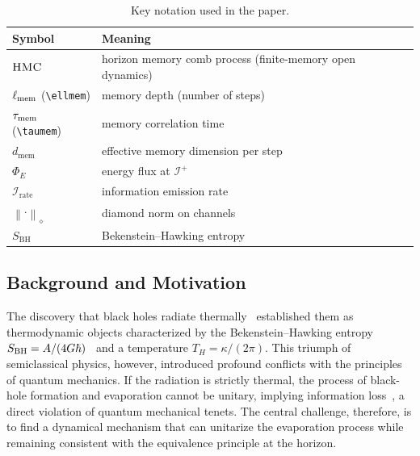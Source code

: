\documentclass[a4paper,11pt]{article}
\newcommand{\Irate}{\mathcal{I}_{\mathrm{rate}}}
\newcommand{\Eflux}{\Phi_E}
\newcommand{\Ddiamond}[1]{\left\|#1\right\|_\diamond}
\newcommand{\HMC}{\textsc{HMC}\xspace}
\newcommand{\dmem}{\ensuremath{d_{\mathrm{mem}}}}
\newcommand{\SBH}{\ensuremath{S_{\mathrm{BH}}}}
\theoremstyle{plain}
\theoremstyle{definition}
\theoremstyle{remark}
\begin{document}
\begin{table}[t]
  \centering
  \caption{Key notation used in the paper.}
  \label{tab:notation}
  \begin{tabular}{ll}
    \toprule
    Symbol & Meaning \\
    \midrule
    $\HMC{}$ & horizon memory comb process (finite-memory open dynamics) \\
    $\ell_{\rm mem}$ (\texttt{\textbackslash ellmem}) & memory depth (number of steps) \\
    $\tau_{\rm mem}$ (\texttt{\textbackslash taumem}) & memory correlation time \\
    $\dmem$ & effective memory dimension per step \\
    $\Eflux$ & energy flux at $\mathscr{I}^+$ \\
    $\Irate$ & information emission rate \\
    $\Ddiamond{\cdot}$ & diamond norm on channels \\
    $\SBH$ & Bekenstein--Hawking entropy \\
    \bottomrule
  \end{tabular}
\end{table}

\subsection{Background and Motivation}
The discovery that black holes radiate thermally~\cite{Hawking:1975} established them as thermodynamic objects characterized by the Bekenstein--Hawking entropy $S_{\rm BH} = A/(4G\hbar)$~\cite{Bekenstein:1973} and a temperature $T_H = \kappa/(2\pi)$. This triumph of semiclassical physics, however, introduced profound conflicts with the principles of quantum mechanics. If the radiation is strictly thermal, the process of black\nobreakdash-hole formation and evaporation cannot be unitary, implying information loss~\cite{Hawking:1976}, a direct violation of quantum mechanical tenets. The central challenge, therefore, is to find a dynamical mechanism that can unitarize the evaporation process while remaining consistent with the equivalence principle at the horizon.
\end{document}
